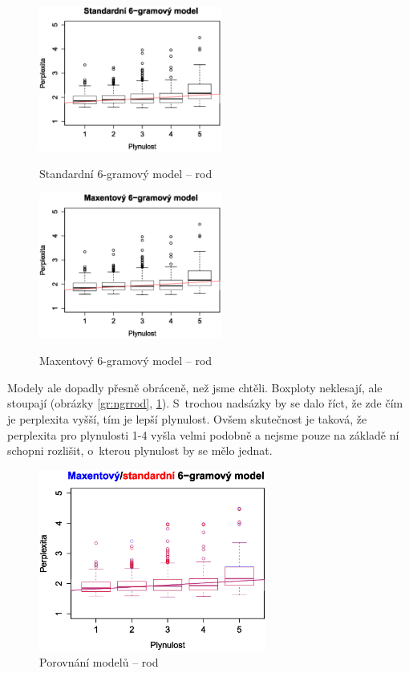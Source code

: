 \documentclass[12pt,a4paper]{report}
\begin{document}
\begin{figure}[!htb]
\begin{center}
  \centering\includegraphics[width=60mm]{./grafy/morf/ngram/rod.svg.eps}
  \caption{Standardní 6-gramový model -- rod}\label{gr:ngrrod}
\endminipage\quad
{}
  \centering\includegraphics[width=60mm]{./grafy/morf/maxent/rod.svg.eps}
  \caption{Maxentový 6-gramový model -- rod}\label{gr:maxrod}
\endminipage
\end{center}
\end{figure}

Modely ale dopadly přesně obráceně, než jsme chtěli. Box\-ploty neklesají, ale stoupají (obrázky \ref{gr:ngrrod}, \ref{gr:maxrod}). S~trochou nadsázky by se dalo říct, že zde čím je perplexita vyšší, tím je lepší plynulost. Ovšem skutečnost je taková, že perplexita pro plynulosti 1-4 vyšla velmi podobně a nejsme pouze na základě ní schopni rozlišit, o~kterou plynulost by se mělo jednat.





\begin{figure}[!htbp]
\begin{center}
	\centering
	\includegraphics[width=75mm]{./grafy/morf/porovnani/rod.svg.eps}	
	\caption{Porovnání modelů -- rod}\label{gr:porrod}
\endminipage
\end{center}
\end{figure}
\end{document}
